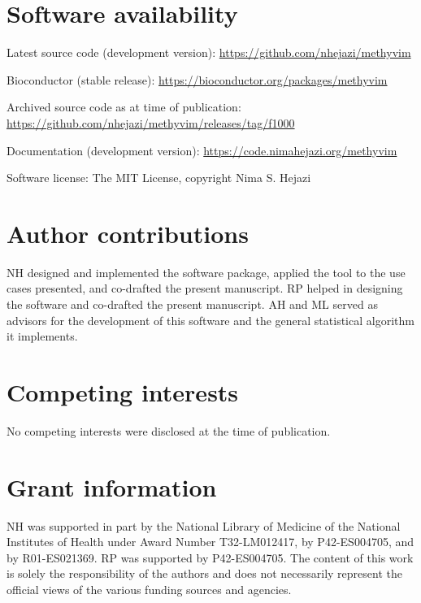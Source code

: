 \documentclass[9pt,a4paper,]{extarticle}
\theoremstyle{definition}
\theoremstyle{definition}
\theoremstyle{definition}
\theoremstyle{remark}
\begin{document}
\hypertarget{software-availability}{%
\section{Software availability}\label{software-availability}}

Latest source code (development version): \url{https://github.com/nhejazi/methyvim}

Bioconductor (stable release): \url{https://bioconductor.org/packages/methyvim}

Archived source code as at time of publication:
\url{https://github.com/nhejazi/methyvim/releases/tag/f1000}

Documentation (development version): \url{https://code.nimahejazi.org/methyvim}

Software license: The MIT License, copyright Nima S. Hejazi

\hypertarget{author-contributions}{%
\section{Author contributions}\label{author-contributions}}

NH designed and implemented the software package, applied the tool to the use
cases presented, and co-drafted the present manuscript. RP helped in designing
the software and co-drafted the present manuscript. AH and ML served as advisors
for the development of this software and the general statistical algorithm it
implements.

\hypertarget{competing-interests}{%
\section{Competing interests}\label{competing-interests}}

No competing interests were disclosed at the time of publication.

\hypertarget{grant-information}{%
\section{Grant information}\label{grant-information}}

NH was supported in part by the National Library of Medicine of the National
Institutes of Health under Award Number T32-LM012417, by P42-ES004705, and
by R01-ES021369. RP was supported by P42-ES004705. The content of this work is
solely the responsibility of the authors and does not necessarily represent the
official views of the various funding sources and agencies.
\end{document}
